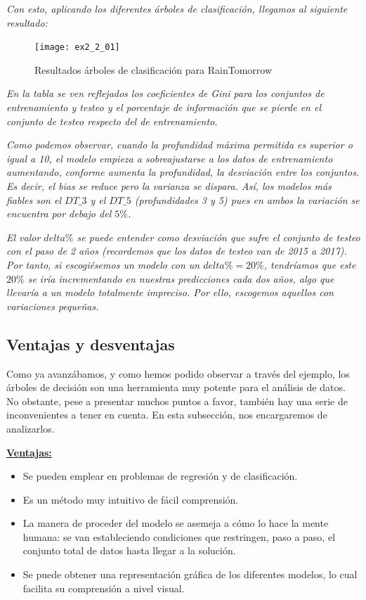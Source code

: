\documentclass[12pt,twoside]{article}
\begin{document}
\textit{Con esto, aplicando los diferentes árboles de clasificación, llegamos al siguiente resultado:}

\begin{figure}[h]
\centering
\texttt{[image: ex2\_2\_01]}
\caption{Resultados árboles de clasificación para RainTomorrow}
\end{figure}

\textit{En la tabla se ven reflejados los coeficientes de Gini para los conjuntos de entrenamiento y testeo y el porcentaje de información que se pierde en el conjunto de testeo respecto del de entrenamiento.}

\textit{Como podemos observar, cuando la profundidad máxima permitida es superior o igual a 10, el modelo empieza a sobreajustarse a los datos de entrenamiento aumentando, conforme aumenta la profundidad, la desviación entre los conjuntos. Es decir, el bias se reduce pero la varianza se dispara. Así, los modelos más fiables son el $DT\_3$ y el $DT\_5$ (profundidades 3 y 5) pues en ambos la variación se encuentra por debajo del $5\%$.}

\textit{El valor $delta\%$ se puede entender como desviación que sufre el conjunto de testeo con el paso de 2 años (recordemos que los datos de testeo van de 2015 a 2017). Por tanto, si escogiésemos un modelo con un $delta\% = 20\%$, tendríamos que este $20\%$ se iría incrementando en nuestras predicciones cada dos años, algo que llevaría a un modelo totalmente impreciso. Por ello, escogemos aquellos con variaciones pequeñas.}



\subsection{Ventajas y desventajas}
Como ya avanzábamos, y como hemos podido observar a través del ejemplo, los árboles de decisión son una herramienta muy potente para el análisis de datos. No obstante, pese a presentar muchos puntos a favor, también hay una serie de inconvenientes a tener en cuenta. En esta subsección, nos encargaremos de analizarlos.

\textbf{\underline{Ventajas:}}
\begin{itemize}
\item Se pueden emplear en problemas de regresión y de clasificación.
\item Es un método muy intuitivo de fácil comprensión.
\item La manera de proceder del modelo se asemeja a cómo lo hace la mente humana: se van estableciendo condiciones que restringen, paso a paso, el conjunto total de datos hasta llegar a la solución.
\item Se puede obtener una representación gráfica de los diferentes modelos, lo cual facilita su comprensión a nivel visual.
\end{itemize}
\end{document}
